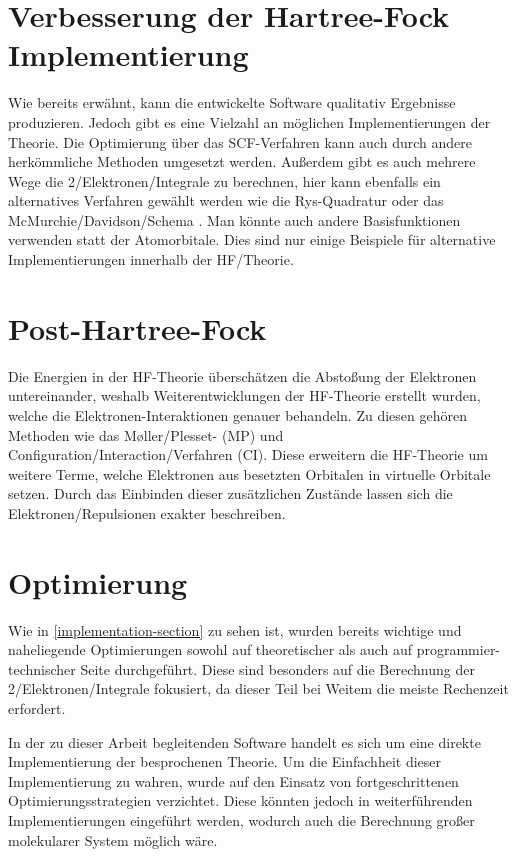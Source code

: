 \section{Verbesserung der Hartree-Fock Implementierung}
Wie bereits erwähnt, kann die entwickelte Software qualitativ
Ergebnisse produzieren. Jedoch gibt es eine Vielzahl an
möglichen Implementierungen der Theorie.
Die Optimierung über das SCF-Verfahren kann auch durch
andere herkömmliche Methoden umgesetzt werden. Außerdem gibt
es auch mehrere Wege die 2\-/Elektronen\-/Integrale zu berechnen,
hier kann ebenfalls ein alternatives Verfahren gewählt werden
wie die Rys-Quadratur oder das McMurchie\-/Davidson\-/Schema \cite[9.9, 9.11]{structure_2013}.
Man könnte auch andere Basisfunktionen verwenden statt der Atomorbitale.
Dies sind nur einige Beispiele für alternative Implementierungen
innerhalb der HF\-/Theorie.

\section{Post-Hartree-Fock}
Die Energien in der HF-Theorie überschätzen die Abstoßung der Elektronen untereinander,
weshalb Weiterentwicklungen der HF-Theorie erstellt wurden,
welche die Elektronen-Interaktionen genauer behandeln.
Zu diesen gehören Methoden wie das Møller\-/Plesset- (MP)
und Configuration\-/Interaction\-/Verfahren (CI).
Diese erweitern die HF-Theorie um weitere Terme,
welche Elektronen aus besetzten Orbitalen in virtuelle Orbitale setzen.
Durch das Einbinden dieser zusätzlichen Zustände lassen
sich die Elektronen\-/Repulsionen exakter beschreiben.

\cite[S. 3]{tc2_phf}
\cite[5.4.2, 5.4.3]{lewars_2016}

\section{Optimierung}
Wie in \cref{implementation-section} zu sehen ist,
wurden bereits wichtige und naheliegende Optimierungen
sowohl auf theoretischer als auch auf programmier-technischer Seite durchgeführt.
Diese sind besonders auf die Berechnung der 2\-/Elektronen\-/Integrale fokusiert,
da dieser Teil bei Weitem die meiste Rechenzeit erfordert.

In der zu dieser Arbeit begleitenden Software handelt es sich
um eine direkte Implementierung der besprochenen Theorie.
Um die Einfachheit dieser Implementierung zu wahren, wurde auf den Einsatz von
fortgeschrittenen Optimierungsstrategien verzichtet.
Diese könnten jedoch in weiterführenden Implementierungen eingeführt werden,
wodurch auch die Berechnung großer molekularer System möglich wäre.

